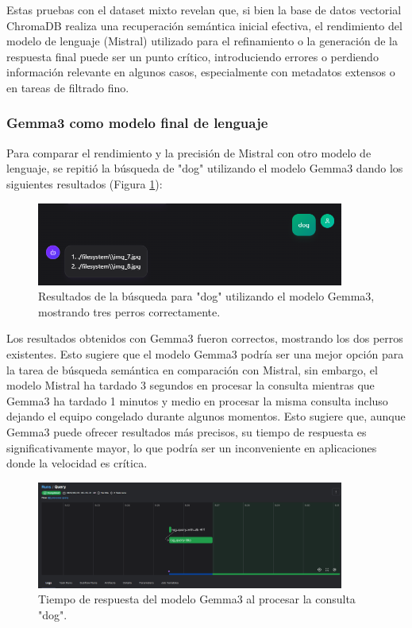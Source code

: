 Estas pruebas con el dataset mixto revelan que, si bien la base de datos vectorial ChromaDB realiza una recuperación semántica inicial efectiva, el rendimiento del modelo de lenguaje (Mistral) utilizado para el refinamiento o la generación de la respuesta final puede ser un punto crítico, introduciendo errores o perdiendo información relevante en algunos casos, especialmente con metadatos extensos o en tareas de filtrado fino.

\subsubsection{Gemma3 como modelo final de lenguaje}
\label{sec:gemma3_test}

Para comparar el rendimiento y la precisión de Mistral con otro modelo de lenguaje, se repitió la búsqueda de "dog" utilizando el modelo Gemma3 dando los siguientes resultados (Figura \ref{fig:gemma3_dogs_search_results}):
\begin{figure}[H]
\centering
\includegraphics[width=0.9\textwidth]{archivos/gemma3_dogs_result.png}
\caption[Resultados de búsqueda para "dog" con Gemma3]{Resultados de la búsqueda para "dog" utilizando el modelo Gemma3, mostrando tres perros correctamente.}
\label{fig:gemma3_dogs_search_results}
\end{figure}

Los resultados obtenidos con Gemma3 fueron correctos, mostrando los dos perros existentes. Esto sugiere que el modelo Gemma3 podría ser una mejor opción para la tarea de búsqueda semántica en comparación con Mistral, sin embargo, el modelo Mistral ha tardado 3 segundos en procesar la consulta mientras que Gemma3 ha tardado 1 minutos y medio en procesar la misma consulta incluso dejando el equipo congelado durante algunos momentos. Esto sugiere que, aunque Gemma3 puede ofrecer resultados más precisos, su tiempo de respuesta es significativamente mayor, lo que podría ser un inconveniente en aplicaciones donde la velocidad es crítica.
\begin{figure}[H]
\centering
\includegraphics[width=0.9\textwidth]{archivos/gemma3_time.png}
\caption[Tiempo de respuesta de Gemma3]{Tiempo de respuesta del modelo Gemma3 al procesar la consulta "dog".}
\label{fig:gemma3_time}
\end{figure}

